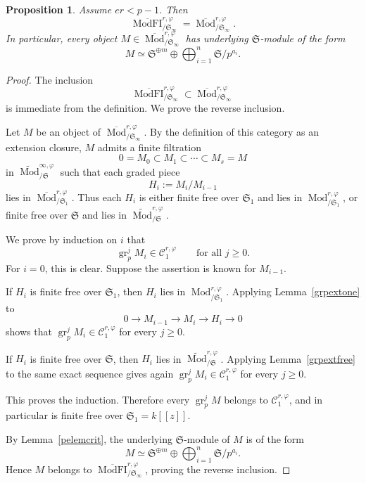 \documentclass[11pt]{amsart}
\newtheorem{proposition}[lemma]{Proposition}
\numberwithin{equation}{section}
\newcommand{\ModFI}{\operatorname{ModFI}}
\newcommand{\mf}{\mathfrak}
\newcommand{\Mod}{\operatorname{Mod}}
\newcommand{\gr}{{\operatorname{gr}}}
\newcommand{\mS}{\mf{S}}
\numberwithin{equation}{section}
\begin{document}
\begin{proposition}\label{modfieq}
Assume $er<p-1$.  Then
\[
  \overline{\ModFI}^{r,\varphi}_{/\mS_\infty}
  =
  \overline{\Mod}^{r,\varphi}_{/\mS_\infty}.
\]
In particular, every object $M\in\overline{\Mod}^{r,\varphi}_{/\mS_\infty}$
has underlying $\mS$-module of the form
\[
  M\simeq
  \mS^{\oplus m}
  \oplus
  \bigoplus_{i=1}^n \mS/p^{a_i}.
\]
\end{proposition}

\begin{proof}
The inclusion
\[
  \overline{\ModFI}^{r,\varphi}_{/\mS_\infty}
  \subset
  \overline{\Mod}^{r,\varphi}_{/\mS_\infty}
\]
is immediate from the definition.  We prove the reverse inclusion.

Let $M$ be an object of $\overline{\Mod}^{r,\varphi}_{/\mS_\infty}$.  By the
definition of this category as an extension closure, $M$ admits a finite
filtration
\[
  0=M_0\subset M_1\subset \cdots \subset M_s=M
\]
in $\widetilde{\Mod}^{\infty,\varphi}_{/\mS}$ such that each graded piece
\[
  H_i:=M_i/M_{i-1}
\]
lies in $\overline{\Mod}^{r,\varphi}_{/\mS_1}$.  Thus each $H_i$ is either
finite free over $\mS_1$ and lies in $\Mod^{r,\varphi}_{/\mS_1}$, or finite
free over $\mS$ and lies in $\widetilde{\Mod}^{r,\varphi}_{/\mS}$.

We prove by induction on $i$ that
\[
  \gr_p^j M_i\in\mathcal C_1^{r,\varphi}
  \qquad
  \text{for all } j\geq 0.
\]
For $i=0$, this is clear.  Suppose the assertion is known for $M_{i-1}$.

If $H_i$ is finite free over $\mS_1$, then $H_i$ lies in
$\Mod^{r,\varphi}_{/\mS_1}$.  Applying Lemma~\ref{grpextone} to
\[
  0\longrightarrow M_{i-1}
  \longrightarrow M_i
  \longrightarrow H_i
  \longrightarrow 0
\]
shows that $\gr_p^jM_i\in\mathcal C_1^{r,\varphi}$ for every $j\geq 0$.

If $H_i$ is finite free over $\mS$, then $H_i$ lies in
$\widetilde{\Mod}^{r,\varphi}_{/\mS}$.  Applying Lemma~\ref{grpextfree} to the same
exact sequence gives again
$\gr_p^jM_i\in\mathcal C_1^{r,\varphi}$ for every $j\geq 0$.

This proves the induction.  Therefore every $\gr_p^jM$ belongs to
$\mathcal C_1^{r,\varphi}$, and in particular is finite free over
$\mS_1=k[[z]]$.

By Lemma~\ref{pelemcrit}, the underlying $\mS$-module of $M$ is of the form
\[
  M\simeq
  \mS^{\oplus m}
  \oplus
  \bigoplus_{i=1}^n \mS/p^{a_i}.
\]
Hence $M$ belongs to
$\overline{\ModFI}^{r,\varphi}_{/\mS_\infty}$, proving the reverse
inclusion.
\end{proof}
\end{document}
